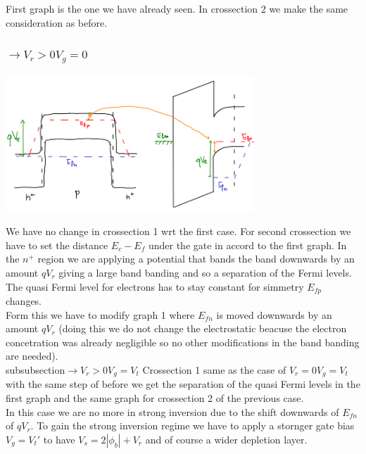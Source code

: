 First graph is the one we have already seen. In crossection 2 we make the same consideration as before.

\subsubsection{$\rightarrow V_r>0 V_g=0$}

\centering
\includegraphics[width=0.7\textwidth]{what2.png}\\
\raggedright

We have no change in crossection 1 wrt the first case.
For second crossection we have to set the distance $E_c-E_f$ under the gate in accord to the first graph. In the $n^+$ region we are applying a potential that bands the band downwards by an amount $qV_r$ giving a large band banding and so a separation of the Fermi levels.\\
The quasi Fermi level for electrons has to stay constant for simmetry $E_{fp}$ changes.\\
Form this we have to modify graph 1 where $E_{fn}$ is moved downwards by an amount $qV_r$ (doing this we do not change the electrostatic beacuse the electron concetration was already negligible so no other modifications in the band banding are needed).\\

subsubsection{$\rightarrow V_r>0 V_g=V_t$}
Crossection 1 same as the case of $V_r=0 V_g=V_t$ with the same step of before we get the separation of the quasi Fermi levels in the first graph and the same graph for crossection 2 of the previous case.\\
In this case we are no more in strong inversion due to the shift downwards of $E_{fn}$ of $qV_r$. To gain the strong inversion regime we have to apply a stornger gate bias $V_g=V_t'$ to have $V_s=2|\phi_b|+V_r$ and of course a wider depletion layer.\\

